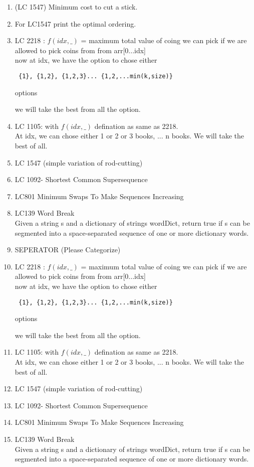 \begin{exercise}
    \begin{enumerate}
    \item (LC 1547) Minimum cost to cut a stick.
    \item  For LC1547 print the optimal ordering.
    \item 
    LC 2218 : $f(idx,\_)$ = maximum total value of coing we can pick if we are allowed to pick coins from from arr[0...idx]\\
    now at idx, we have the option to chose either \begin{verbatim} {1}, {1,2}, {1,2,3}... {1,2,...min(k,size)} \end{verbatim} options
       
    we will take the best from all the option.
   
    \item LC 1105: with $f(idx,\_)$ defination as same as 2218.\\
    At idx, we can chose either 1 or 2 or 3 books, ... n books. We will take the best of all.

    \item LC 1547 (simple variation of rod-cutting)
    \item LC 1092- Shortest Common Supersequence
    \item LC801 Minimum Swaps To Make Sequences Increasing 
    \item LC139 Word Break\\ Given a string s and a dictionary of strings wordDict, return true if s can be segmented into a space-separated sequence of one or more dictionary words.
    \item SEPERATOR (Please Categorize)
    \item 
    LC 2218 : $f(idx,\_)$ = maximum total value of coing we can pick if we are allowed to pick coins from from arr[0...idx]\\
    now at idx, we have the option to chose either \begin{verbatim} {1}, {1,2}, {1,2,3}... {1,2,...min(k,size)} \end{verbatim} options
       
    we will take the best from all the option.
   
    \item LC 1105: with $f(idx,\_)$ defination as same as 2218.\\
    At idx, we can chose either 1 or 2 or 3 books, ... n books. We will take the best of all.

    \item LC 1547 (simple variation of rod-cutting)
    \item LC 1092- Shortest Common Supersequence
    \item LC801 Minimum Swaps To Make Sequences Increasing 
    \item LC139 Word Break\\ Given a string s and a dictionary of strings wordDict, return true if s can be segmented into a space-separated sequence of one or more dictionary words.
\end{enumerate}
\end{exercise}

